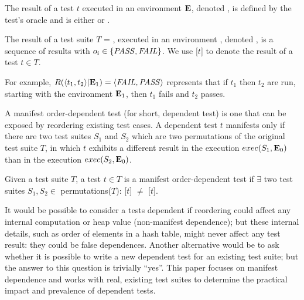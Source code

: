 \begin{definition}
The result of a test $t$ executed in an environment\/ $\mathbf{E}$,
denoted\/ , is defined by the test's oracle
and is either \pass or \fail.

The result of a test suite\/ $T$ = , executed in an
environment\/ \env, denoted\/ , is a
sequence of results\/  with $o_i \in \{\mathit{PASS},\mathit{FAIL}\}$.
We use [$t$] to denote the result of a test $t \in T$.


For example, $R( \langle t_1, t_2 \rangle |\mathbf{E}_1) =  \langle \mathit{FAIL}, \mathit{PASS} \rangle $ represents that if
$t_1$ then $t_2$ are run, starting with the environment\/ $\mathbf{E}_1$, then\/
$t_1$ fails and\/ $t_2$ passes.
\end{definition}

A manifest order-dependent test (for short, dependent test)
is one that can be exposed by 
reordering existing test cases.
A dependent test $t$ manifests only
if there are two test suites $S_1$ and $S_2$ which
are two permutations of the original test suite $T$,
in which $t$ exhibits a different result
in the execution $exec(S_1,\mathbf{E}_0)$
than in the execution $exec(S_2,\mathbf{E}_0)$.

\begin{definition} \label{def:manifest}
Given a test suite\/ $T$, a test $t \in T$ is a
manifest order-dependent test if $\exists$ two test suites
$S_1, S_2 \in$ permutations($T$):
[$t$] $\neq$
[$t$].
%
\end{definition}

It would be possible to consider a tests dependent if reordering could
affect any internal computation or heap value (non-manifest dependence);
but these internal details, such as order of elements in a hash table,
might never affect any test result: they could be false dependences.
Another alternative would be to ask
whether it is possible to write a new dependent test for an existing
test suite; but the answer to this question is trivially ``yes''.
This paper focuses on manifest dependence and works with real, existing
test suites to determine the practical impact and prevalence of dependent
tests.


